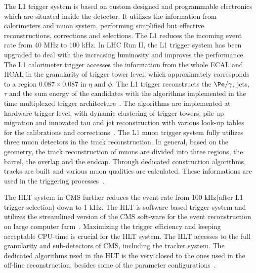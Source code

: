 The L1 trigger system is based on custom designed and programmable electronics which are situated inside the detector. It utilizes the information from calorimeters and muon system, performing simplified but effective reconstructions, corrections and selections. The L1 reduces the incoming event rate from 40 MHz to 100 kHz. In LHC Run II, the L1 trigger system has been upgraded to deal with the increasing luminosity and improves the performance. The L1 calorimeter trigger accesses the information from the whole ECAL and HCAL in the granularity of trigger tower level, which approximately corresponds to a region $0.087\times0.087$ in $\eta$ and $\phi$. The L1 trigger reconstructs the $\Pe/\gamma$, jets, $\tau$ and the sum energy of the candidates with the algorithms implemented in the time multiplexed trigger architecture~\cite{TMT_trigger}. The algorithms are implemented at hardware trigger level, with dynamic clustering of trigger towers, pile-up migration and innovated tau and jet reconstruction with various look-up tables for the calibrations and corrections~\cite{L1_Egamma}. The L1 muon trigger system fully utilizes three muon detectors in the track reconstruction. In general, based on the geometry, the track reconstruction of muons are divided into three regions, the barrel, the overlap and the endcap. Through dedicated construction algorithms, tracks are built and various muon qualities are calculated. These informations are used in the triggering processes~\cite{L1muontrigger}. 


The HLT system in CMS further reduces the event rate from 100 kHz(after L1 trigger selection) down to 1 kHz. The HLT is software based trigger system and utilizes the streamlined version of the CMS soft-ware for the event reconstruction on large computer farm~\cite{CMS_trigger_RUNII}. Maximizing the trigger efficiency and keeping acceptable CPU-time is crucial for the HLT system. The HLT accesses to the full granularity and sub-detectors of CMS, including the tracker system. The dedicated algorithms used in the HLT is the very closed to the ones used in the off-line reconstruction, besides some of the parameter configurations~\cite{CMS_HLT_RunII}.             












